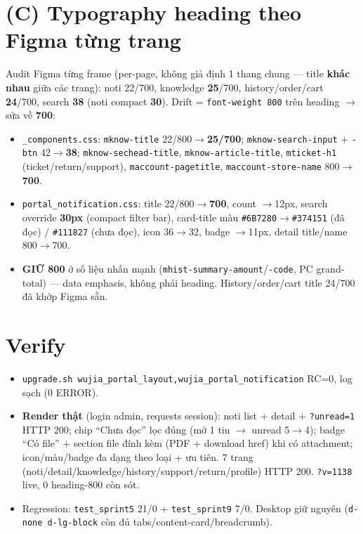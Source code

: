 \section{(C) Typography heading theo Figma từng trang}

Audit Figma từng frame (per-page, không giả định 1 thang chung --- title \textbf{khác nhau} giữa các trang):
noti 22/700, knowledge \textbf{25}/700, history/order/cart \textbf{24}/700, search \textbf{38} (noti compact
\textbf{30}). Drift = \texttt{font-weight 800} trên heading $\rightarrow$ sửa về \textbf{700}:

\begin{itemize}
  \item \texttt{\_components.css}: \texttt{mknow-title} 22/800$\to$\textbf{25/700}; \texttt{mknow-search-input}
        + \texttt{-btn} 42$\to$\textbf{38}; \texttt{mknow-sechead-title}, \texttt{mknow-article-title},
        \texttt{mticket-h1} (ticket/return/support), \texttt{maccount-pagetitle},
        \texttt{maccount-store-name} 800$\to$\textbf{700}.
  \item \texttt{portal\_notification.css}: title 22/800$\to$\textbf{700}, count $\to$12px, search override
        \textbf{30px} (compact filter bar), card-title màu \texttt{\#6B7280}$\to$\texttt{\#374151} (đã đọc) /
        \texttt{\#111827} (chưa đọc), icon 36$\to$32, badge $\to$11px, detail title/name 800$\to$700.
  \item \textbf{GIỮ 800} ở số liệu nhấn mạnh (\texttt{mhist-summary-amount}/\texttt{-code}, PC grand-total)
        --- data emphasis, không phải heading. History/order/cart title 24/700 đã khớp Figma sẵn.
\end{itemize}

\section{Verify}

\begin{itemize}
  \item \texttt{upgrade.sh wujia\_portal\_layout,wujia\_portal\_notification} RC=0, log sạch (0 ERROR).
  \item \textbf{Render thật} (login admin, requests session): noti list + detail + \texttt{?unread=1} HTTP 200;
        chip ``Chưa đọc'' lọc đúng (mở 1 tin $\to$ unread 5$\to$4); badge ``Có file'' + section file đính kèm
        (PDF + download href) khi có attachment; icon/màu/badge đa dạng theo loại + ưu tiên. 7 trang
        (noti/detail/knowledge/history/support/return/profile) HTTP 200. \texttt{?v=1138} live, 0 heading-800
        còn sót.
  \item Regression: \texttt{test\_sprint5} 21/0 + \texttt{test\_sprint9} 7/0. Desktop giữ nguyên (\texttt{d-none
        d-lg-block} còn đủ tabs/content-card/breadcrumb).
\end{itemize}

